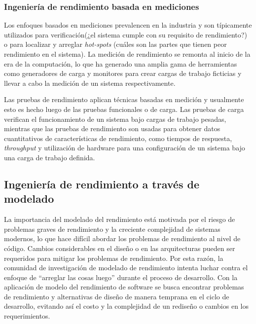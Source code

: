 \documentclass[conference]{IEEEtran}
\begin{document}
\subsubsection{Ingeniería de rendimiento basada en mediciones}
Los enfoques basados en mediciones prevalencen en la industria\cite{thijmen-thesis} y son típicamente utilizados para verificación(¿el sistema cumple con su requisito de rendimiento?) o para localizar y arreglar \emph{hot-spots} (cuáles son las partes que tienen peor rendimiento en el sistema). La medición de rendimiento se remonta al inicio de la era de la computación, lo que ha generado una amplia gama de herramientas como generadores de carga y monitores para crear cargas de trabajo ficticias y llevar a cabo la medición de un sistema respectivamente.

Las pruebas de rendimiento aplican técnicas basadas en medición y usualmente esto es hecho luego de las pruebas funcionales o de carga. Las pruebas de carga verifican el funcionamiento de un sistema bajo cargas de trabajo pesadas, mientras que las pruebas de rendimiento son usadas para obtener datos cuantitativos de características de rendimiento, como tiempos de respuesta, \emph{throughput} y utilización de hardware para una configuración de un sistema bajo una carga de trabajo definida.

\subsection{Ingeniería de rendimiento a través de modelado} 
La importancia del modelado del rendimiento está motivada por el riesgo de problemas graves de rendimiento\cite{palladion-screencast} y la creciente complejidad de sistemas modernos, lo que hace difícil abordar los problemas de rendimiento al nivel de código. Cambios considerables en el diseño o en las arquitecturas pueden ser requeridos para mitigar los problemas de rendimiento. Por esta razón, la comunidad de investigación de modelado de rendimiento intenta luchar contra el enfoque de ``arreglar las cosas luego'' durante el proceso de desarrollo. Con la aplicación de modelo del rendimiento de software se busca encontrar problemas de rendimiento y alternativas de diseño de manera temprana en el ciclo de desarrollo, evitando así el costo y la complejidad de un rediseño o cambios en los requerimientos.
\end{document}
